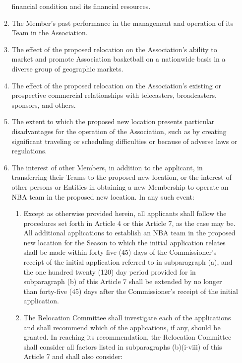\documentclass[]{book}
\providecommand{\tightlist}{%
  \setlength{\itemsep}{0pt}\setlength{\parskip}{0pt}}
\theoremstyle{definition}
\theoremstyle{definition}
\theoremstyle{definition}
\theoremstyle{remark}
\begin{document}
\begin{enumerate}
\begin{enumerate}
    financial condition and its financial resources.
  \item
    The Member's past performance in the management and operation of its
    Team in the Association.
  \item
    The effect of the proposed relocation on the Association's ability
    to market and promote Association basketball on a nationwide basis
    in a diverse group of geographic markets.
  \item
    The effect of the proposed relocation on the Association's existing
    or prospective commercial relationships with telecasters,
    broadcasters, sponsors, and others.
  \item
    The extent to which the proposed new location presents particular
    disadvantages for the operation of the Association, such as by
    creating significant traveling or scheduling difficulties or because
    of adverse laws or regulations.
  \item
    The interest of other Members, in addition to the applicant, in
    transferring their Teams to the proposed new location, or the
    interest of other persons or Entities in obtaining a new Membership
    to operate an NBA team in the proposed new location. In any such
    event:

    \begin{enumerate}
    \def\labelenumiii{(\Alph{enumiii})}
    \tightlist
    \item
      Except as otherwise provided herein, all applicants shall follow
      the procedures set forth in Article 4 or this Article 7, as the
      case may be. All additional applications to establish an NBA team
      in the proposed new location for the Season to which the initial
      application relates shall be made within forty-five (45) days of
      the Commissioner's receipt of the initial application referred to
      in subparagraph (a), and the one hundred twenty (120) day period
      provided for in subparagraph (b) of this Article 7 shall be
      extended by no longer than forty-five (45) days after the
      Commissioner's receipt of the initial application.
    \item
      The Relocation Committee shall investigate each of the
      applications and shall recommend which of the applications, if
      any, should be granted. In reaching its recommendation, the
      Relocation Committee shall consider all factors listed in
      subparagraphs (b)(i-viii) of this Article 7 and shall also
      consider:


\end{enumerate}
\end{enumerate}
\end{enumerate}
\end{document}
